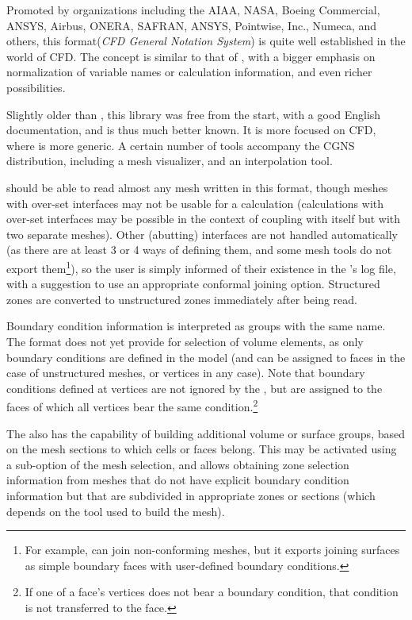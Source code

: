 {{{{
\label{sec:fmtdesc_cgns}

Promoted by organizations including the AIAA, NASA, Boeing Commercial, ANSYS,
Airbus, ONERA, SAFRAN, ANSYS, Pointwise, Inc., Numeca, and others,
this format(\emph{CFD General Notation System}) is quite well established in
the world of CFD. The concept is similar to that of \med, with a bigger
emphasis on normalization of variable names or calculation information, and
even richer possibilities.

Slightly older than \med, this library was free from the start, with a good
English documentation, and is thus much better known. It is more focused
on CFD, where \med is more generic. A certain number of tools accompany
the CGNS distribution, including a mesh visualizer, and an interpolation
tool.

\CS should be able to read almost any mesh written in this format, though
meshes with over-set interfaces may not be usable for a calculation
(calculations with over-set interfaces may be possible in the context of coupling \CS
with itself but with two separate meshes).
Other (abutting) interfaces are not handled automatically (as there are
at least 3 or 4 ways of defining them, and some mesh tools do not export
them\footnote{For example, \icemcfd can join non-conforming meshes, but it
exports joining surfaces as simple boundary faces with user-defined boundary
conditions.}), so the user is simply informed of their existence in the
\pcs's log file, with a suggestion to use an appropriate conformal joining
option. Structured zones are converted to unstructured zones immediately after
being read.

Boundary condition information is interpreted as groups with the same
name. The format does not yet provide for selection of volume elements,
as only boundary conditions are defined in the model (and can be assigned to
faces in the case of unstructured meshes, or vertices in any case).
Note that boundary conditions defined at vertices are not ignored by
the \pcs, but are assigned to the faces of which all vertices bear
the same condition.\footnote{If one of a face's vertices does not bear
a boundary condition, that condition is not transferred to the face.}

The \pcs also has the capability of building additional volume or surface groups,
based on the mesh sections to which cells or faces belong. This may be
activated using a sub-option of the mesh selection, and allows obtaining
zone selection information from meshes that do not have explicit
boundary condition information but that are subdivided in appropriate zones or
sections (which depends on the tool used to build the mesh).

}}}}
